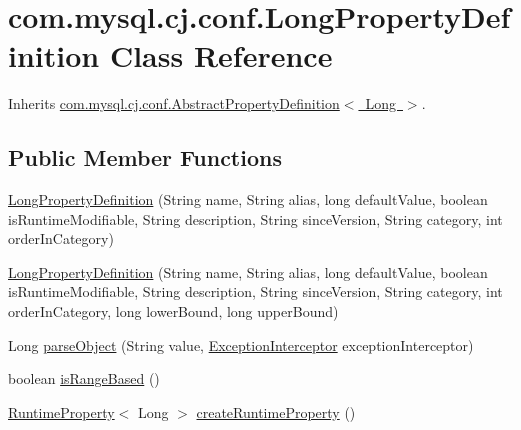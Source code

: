 \hypertarget{classcom_1_1mysql_1_1cj_1_1conf_1_1_long_property_definition}{}\section{com.\+mysql.\+cj.\+conf.\+Long\+Property\+Definition Class Reference}
\label{classcom_1_1mysql_1_1cj_1_1conf_1_1_long_property_definition}


Inherits \mbox{\hyperlink{classcom_1_1mysql_1_1cj_1_1conf_1_1_abstract_property_definition}{com.\+mysql.\+cj.\+conf.\+Abstract\+Property\+Definition$<$ Long $>$}}.

\subsection*{Public Member Functions}
\begin{DoxyCompactItemize}
\item 
\mbox{\hyperlink{classcom_1_1mysql_1_1cj_1_1conf_1_1_long_property_definition_ad5ad62b6d99ce80fe8c9ac1c3630a355}{Long\+Property\+Definition}} (String name, String alias, long default\+Value, boolean is\+Runtime\+Modifiable, String description, String since\+Version, String category, int order\+In\+Category)
\item 
\mbox{\hyperlink{classcom_1_1mysql_1_1cj_1_1conf_1_1_long_property_definition_a8b7ecf1820f647c1f3a1bf8aeb81bd01}{Long\+Property\+Definition}} (String name, String alias, long default\+Value, boolean is\+Runtime\+Modifiable, String description, String since\+Version, String category, int order\+In\+Category, long lower\+Bound, long upper\+Bound)
\item 
Long \mbox{\hyperlink{classcom_1_1mysql_1_1cj_1_1conf_1_1_long_property_definition_a2119fdeb715a2b39c165ca75cf509551}{parse\+Object}} (String value, \mbox{\hyperlink{interfacecom_1_1mysql_1_1cj_1_1exceptions_1_1_exception_interceptor}{Exception\+Interceptor}} exception\+Interceptor)
\item 
boolean \mbox{\hyperlink{classcom_1_1mysql_1_1cj_1_1conf_1_1_long_property_definition_a1e21f3a02b25080e02efc8303361658e}{is\+Range\+Based}} ()
\item 
\mbox{\hyperlink{interfacecom_1_1mysql_1_1cj_1_1conf_1_1_runtime_property}{Runtime\+Property}}$<$ Long $>$ \mbox{\hyperlink{classcom_1_1mysql_1_1cj_1_1conf_1_1_long_property_definition_a62dc153cd1b58382888d34b61cdb531c}{create\+Runtime\+Property}} ()
\end{DoxyCompactItemize}


